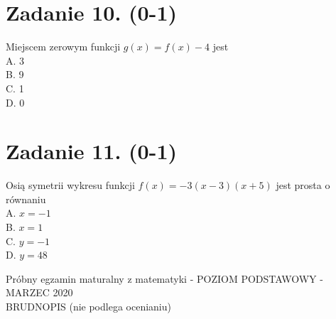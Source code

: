 \documentclass[10pt]{article}
\begin{document}
\section*{Zadanie 10. (0-1)}
Miejscem zerowym funkcji \(g(x)=f(x)-4\) jest\\
A. 3\\
B. 9\\
C. 1\\
D. 0

\section*{Zadanie 11. (0-1)}
Osią symetrii wykresu funkcji \(f(x)=-3(x-3)(x+5)\) jest prosta o równaniu\\
A. \(x=-1\)\\
B. \(x=1\)\\
C. \(y=-1\)\\
D. \(y=48\)

Próbny egzamin maturalny z matematyki - POZIOM PODSTAWOWY - MARZEC 2020\\
BRUDNOPIS (nie podlega ocenianiu)
\end{document}
